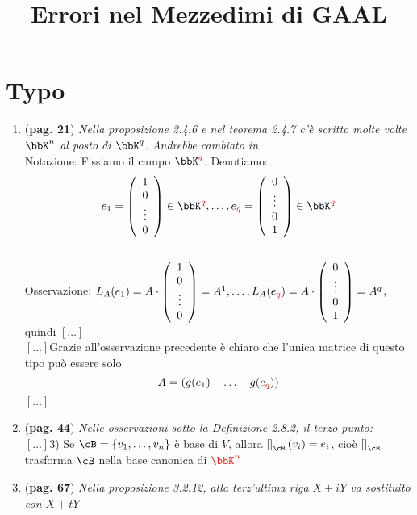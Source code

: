 \documentclass[a4paper,NoNotes,GeneralMath]{stdmdoc}
\newcommand{\omissis}{$\left[ \ldots \right]$\text{ }}
\newcommand{\err}[1]{\color{red}{#1}}
\begin{document}
	\title{Errori nel Mezzedimi di GAAL}
	\autodate

	\section*{Typo}
	\begin{enumerate}
		\item ({\bf pag. 21}) {\it Nella proposizione 2.4.6 e nel teorema 2.4.7 c'è scritto molte volte $\bbK^n$ al posto di $\bbK^q$. Andrebbe cambiato in} \\
		Notazione: Fissiamo il campo $\bbK^{\err q}$. Denotiamo:
			$$e_1 = \left( \begin{array}{c} 1 \\ 0 \\ \vdots \\ 0 \end{array} \right) \in \bbK^{\err q}, \ldots, e_{\err q} = \left( \begin{array}{c} 0 \\ \vdots \\ 0 \\ 1 \end{array} \right) \in \bbK^{\err q}$$ \\
		Osservazione: $L_A(e_1) = A \cdot \left( \begin{array}{c} 1 \\ 0 \\ \vdots \\ 0 \end{array} \right) = A^1, \ldots, L_A(e_{\err q}) = A \cdot \left( \begin{array}{c} 0 \\ \vdots \\ 0 \\ 1 \end{array} \right) = A^q$, quindi \omissis \\
	\omissis Grazie all'osservazione precedente è chiaro che l'unica matrice di questo tipo può essere solo $$ A = (g(e_1) \quad \ldots \quad g(e_{\err q})) $$ \omissis
		\item ({\bf pag. 44}) {\it Nelle osservazioni sotto la Definizione 2.8.2, il terzo punto: } \\
		\omissis 3) Se $\cB = \{v_1, \ldots, v_n\}$ è base di $V$, allora $\left[ \right]_\cB (v_i) = e_i$, cioè $\left[ \right]_\cB$ trasforma $\cB$ nella base canonica di ${\err \bbK^n}$
		\item ({\bf pag. 67}) {\it Nella proposizione 3.2.12, alla terz'ultima riga $X+iY$ va sostituito con $X+tY$} \\

\end{enumerate}
\end{document}
